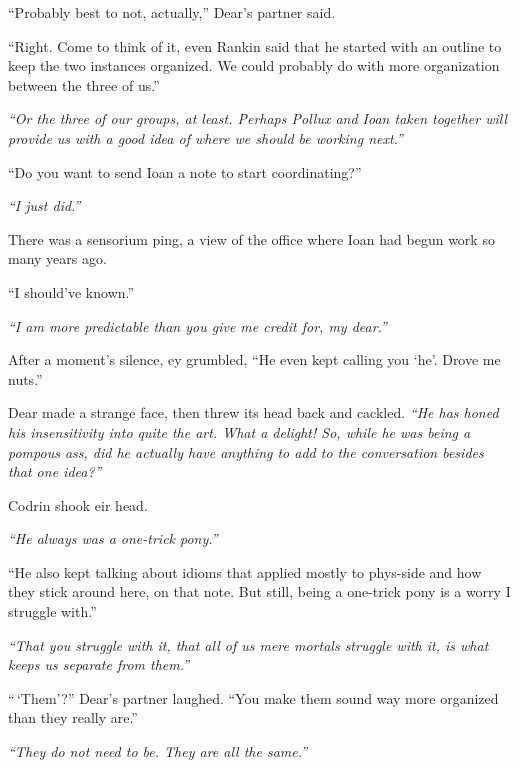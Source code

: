 ``Probably best to not, actually,'' Dear's partner said.

``Right. Come to think of it, even Rankin said that he started with an outline to keep the two instances organized. We could probably do with more organization between the three of us.''

\emph{``Or the three of our groups, at least. Perhaps Pollux and Ioan taken together will provide us with a good idea of where we should be working next.''}

``Do you want to send Ioan a note to start coordinating?''

\emph{``I just did.''}

There was a sensorium ping, a view of the office where Ioan had begun work so many years ago.

``I should've known.''

\emph{``I am more predictable than you give me credit for, my dear.''}

After a moment's silence, ey grumbled, ``He even kept calling you `he'. Drove me nuts.''

Dear made a strange face, then threw its head back and cackled. \emph{``He has honed his insensitivity into quite the art. What a delight! So, while he was being a pompous ass, did he actually have anything to add to the conversation besides that one idea?''}

Codrin shook eir head.

\emph{``He always was a one-trick pony.''}

``He also kept talking about idioms that applied mostly to phys-side and how they stick around here, on that note. But still, being a one-trick pony is a worry I struggle with.''

\emph{``That you struggle with it, that all of us mere mortals struggle with it, is what keeps us separate from them.''}

``\,`Them'?'' Dear's partner laughed. ``You make them sound way more organized than they really are.''

\emph{``They do not need to be. They are all the same.''}
